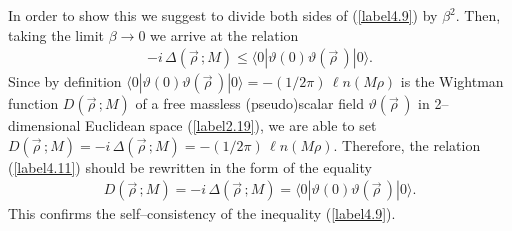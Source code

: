 \documentclass[a4paper,12pt] {article}
\begin{document}
In order to show this we suggest to divide both sides of
(\ref{label4.9}) by $\beta^2$. Then, taking the limit $\beta \to 0$ we
arrive at the relation
%
\begin{eqnarray}\label{label4.11}
- i\,\Delta(\vec{\rho}\,; M) \le \langle
  0|\vartheta(0)\vartheta(\vec{\rho}\,)|0\rangle.
\end{eqnarray}
%
Since by definition $\langle
0|\vartheta(0)\vartheta(\vec{\rho}\,)|0\rangle = - (1/2\pi)\,{\ell
n}(M\rho)$ is the Wightman function $D(\vec{\rho}\,; M)$ of a free
massless (pseudo)scalar field $\vartheta(\vec{\rho}\,)$ in
2--dimensional Euclidean space (\ref{label2.19}), we are able to set
$D(\vec{\rho}\,; M) = - i\,\Delta(\vec{\rho}\,; M) = - (1/2\pi)\,{\ell
n}(M\rho)$. Therefore, the relation (\ref{label4.11}) should be
rewritten in the form of the equality
%
\begin{eqnarray}\label{label4.12}
D(\vec{\rho}\,; M) = - i\,\Delta(\vec{\rho}\,; M) = \langle
  0|\vartheta(0)\vartheta(\vec{\rho}\,)|0\rangle.
\end{eqnarray}
%  
This confirms the self--consistency of the inequality
(\ref{label4.9}).
\end{document}
